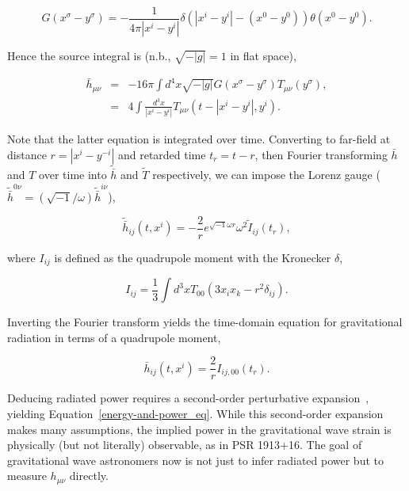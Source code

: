 \begin{equation}
G(x^\sigma - y^\sigma) = - \frac{1}{4\pi |x^i - y^i|}\delta \left(|x^i - y^i| - (x^0 - y^0)\right)\theta(x^0 - y^0).
\end{equation}

\noindent Hence the source integral is (n.b., $\sqrt{-|g|} = 1$ in flat space),

\begin{eqnarray}
\bar{h}_{\mu\nu} &=& -16\pi \int d^4 x \sqrt{-|g|} G(x^\sigma - y^\sigma) T_{\mu\nu}(y^\sigma),
\\
 &=& 4 \int \frac{d^3 x}{|x^i - y^i|} T_{\mu\nu} \left(t - |x^i - y^i|, y^i \right).
\end{eqnarray}

\noindent Note that the latter equation is integrated over time. 
Converting to far-field at distance $r = |x^i - y^{-i}|$ and retarded time $t_r = t - r$, then Fourier transforming $\bar{h}$ and $T$ over time into $\tilde{\bar{h}}$ and $\tilde{T}$ respectively, we can impose the Lorenz gauge ($\tilde{\bar{h}}^{0\nu} = (\sqrt{-1}/\omega) \tilde{\bar{h}}^{i\nu}$),

\begin{equation} 
\tilde{\bar{h}}_{ij} (t,x^i) = -\frac{2}{r}e^{\sqrt{-1}\omega r}\omega^2 \tilde{I}_{ij}(t_r),
\label{Fourier-domain-quadpole-eq}
\end{equation}

\noindent where $I_{ij}$ is defined as the quadrupole moment with the Kronecker $\delta$, 

\begin{equation}
I_{ij} = \frac{1}{3}\int d^3 x T_{00} \left(3 x_i x_k - r^2 \delta_{ij}\right).
\end{equation}

\noindent Inverting the Fourier transform yields the time-domain equation for gravitational radiation in terms of a quadrupole moment,

\begin{equation}
\bar{h}_{ij}(t, x^i) = \frac{2}{r} I_{ij,00} (t_r).
\end{equation}

Deducing radiated power requires a second-order perturbative expansion~\cite{Carroll1997,BallmerThesis}, yielding Equation~\ref{energy-and-power_eq}.
While this second-order expansion makes many assumptions, the implied power in the gravitational wave strain is physically (but not literally) observable, as in PSR 1913+16.
The goal of gravitational wave astronomers now is not just to infer radiated power but to measure $h_{\mu\nu}$ directly.


